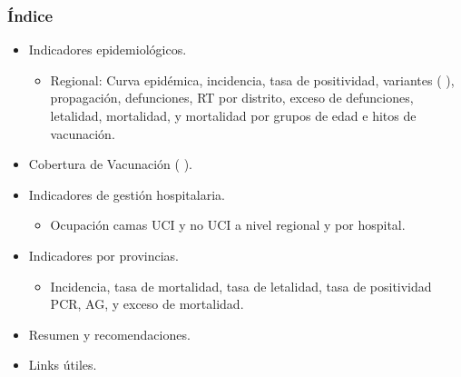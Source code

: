 \documentclass[xcolor=table]{beamer}
\begin{document}
	\setcounter{subsection}{1}
	\begin{frame}[label=indice]
		\frametitle{Índice}
		\vspace{-.5cm}
		\begin{itemize}
			\item Indicadores epidemiológicos.
			\begin{itemize}
				\item Regional: Curva epidémica, incidencia, tasa de positividad, variantes ( \hyperlink{variantes}{}), propagación, defunciones, RT por distrito, exceso de defunciones, letalidad, mortalidad, y mortalidad por grupos de edad e hitos de vacunación.  \hyperlink{epi_cusco}{} 
			\end{itemize} 
			\item Cobertura de Vacunación ( \hyperlink{cobertura_vacuna}{}). 
			\item Indicadores de gestión hospitalaria.
			\begin{itemize}
				\item Ocupación camas UCI y no UCI a nivel regional y por hospital. \hyperlink{camas}{} 
			\end{itemize}
			\item Indicadores por provincias.
			\begin{itemize}
				\item Incidencia, tasa de mortalidad, tasa de letalidad, tasa de positividad PCR, AG, y exceso de mortalidad. \hyperlink{provincias}{}
			\end{itemize}
			\item Resumen y recomendaciones. \hyperlink{Resumen}{} \hyperlink{recomendaciones}{}
			\item Links útiles. \hyperlink{links}{} \hfill \hyperlink{vacunas_90}{}
		\end{itemize}
	\end{frame}
	
	
\end{document}
